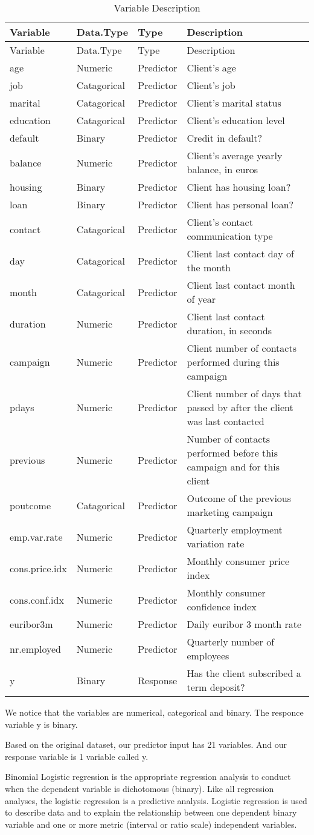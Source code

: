 \documentclass[english,man]{apa6}
\begin{document}
\begin{longtable}[c]{@{}llll@{}}
\caption{Variable Description}\tabularnewline
\toprule
Variable & Data.Type & Type & Description\tabularnewline
\midrule
\endfirsthead
\toprule
Variable & Data.Type & Type & Description\tabularnewline
\midrule
\endhead
age & Numeric & Predictor & Client's age\tabularnewline
job & Catagorical & Predictor & Client's job\tabularnewline
marital & Catagorical & Predictor & Client's marital
status\tabularnewline
education & Catagorical & Predictor & Client's education
level\tabularnewline
default & Binary & Predictor & Credit in default?\tabularnewline
balance & Numeric & Predictor & Client's average yearly balance, in
euros\tabularnewline
housing & Binary & Predictor & Client has housing loan?\tabularnewline
loan & Binary & Predictor & Client has personal loan?\tabularnewline
contact & Catagorical & Predictor & Client's contact communication
type\tabularnewline
day & Catagorical & Predictor & Client last contact day of the
month\tabularnewline
month & Catagorical & Predictor & Client last contact month of
year\tabularnewline
duration & Numeric & Predictor & Client last contact duration, in
seconds\tabularnewline
campaign & Numeric & Predictor & Client number of contacts performed
during this campaign\tabularnewline
pdays & Numeric & Predictor & Client number of days that passed by after
the client was last contacted\tabularnewline
previous & Numeric & Predictor & Number of contacts performed before
this campaign and for this client\tabularnewline
poutcome & Catagorical & Predictor & Outcome of the previous marketing
campaign\tabularnewline
emp.var.rate & Numeric & Predictor & Quarterly employment variation
rate\tabularnewline
cons.price.idx & Numeric & Predictor & Monthly consumer price
index\tabularnewline
cons.conf.idx & Numeric & Predictor & Monthly consumer confidence
index\tabularnewline
euribor3m & Numeric & Predictor & Daily euribor 3 month
rate\tabularnewline
nr.employed & Numeric & Predictor & Quarterly number of
employees\tabularnewline
y & Binary & Response & Has the client subscribed a term
deposit?\tabularnewline
\bottomrule
\end{longtable}

We notice that the variables are numerical, categorical and binary. The
responce variable y is binary.

Based on the original dataset, our predictor input has 21 variables. And
our response variable is 1 variable called y.

Binomial Logistic regression is the appropriate regression analysis to
conduct when the dependent variable is dichotomous (binary). Like all
regression analyses, the logistic regression is a predictive analysis.
Logistic regression is used to describe data and to explain the
relationship between one dependent binary variable and one or more
metric (interval or ratio scale) independent variables.
\end{document}
